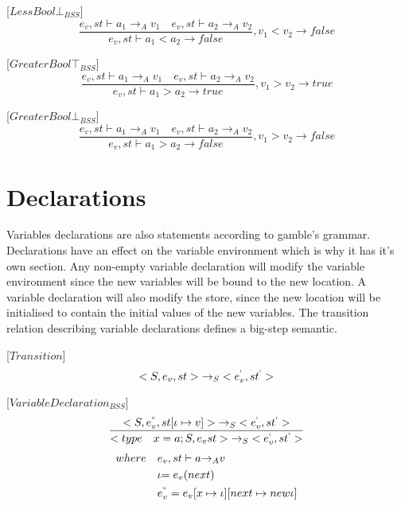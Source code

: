 [${LessBool\bot}_{BSS}$]
\begin{equation}
	\frac { { e }_{ v },st\vdash { a }_{ 1 }{ \rightarrow  }_{ A }{ v }_{ 1 }\quad { e }_{ v },st\vdash { a }_{ 2 }{ \rightarrow  }_{ A }{ v }_{ 2 } }{ { e }_{ v },st\vdash { a }_{ 1 }<{ a }_{ 2 }{ \rightarrow  }false } ,{ v }_{ 1 }<{ v }_{ 2 }\rightarrow false
\end{equation}

[${GreaterBool\top}_{BSS}$]
\begin{equation}
	\frac { { e }_{ v },st\vdash { a }_{ 1 }{ \rightarrow  }_{ A }{ v }_{ 1 }\quad { e }_{ v },st\vdash { a }_{ 2 }{ \rightarrow  }_{ A }{ v }_{ 2 } }{ { e }_{ v },st\vdash { a }_{ 1 }>{ a }_{ 2 }{ \rightarrow  }true } ,{ v }_{ 1 }>{ v }_{ 2 }\rightarrow true
\end{equation}

[${GreaterBool\bot}_{BSS}$]
\begin{equation}
	\frac { { e }_{ v },st\vdash { a }_{ 1 }{ \rightarrow  }_{ A }{ v }_{ 1 }\quad { e }_{ v },st\vdash { a }_{ 2 }{ \rightarrow  }_{ A }{ v }_{ 2 } }{ { e }_{ v },st\vdash { a }_{ 1 }>{ a }_{ 2 }{ \rightarrow  }false } ,{ v }_{ 1 }>{ v }_{ 2 }\rightarrow false
\end{equation}

\section*{Declarations}
Variables declarations are also statements according to \gls{gamble}'s grammar.
Declarations have an effect on the variable environment which is why it has it's own section.
Any non-empty variable declaration will modify the variable environment since the new variables will be bound to the new location.
A variable declaration will also modify the store, since the new location will be initialised to contain the initial values of the new variables.
The transition relation describing variable declarations defines a big-step semantic.

[$Transition$]
\begin{equation}
<{ S },{ e }_{ v },st>{ \rightarrow  }_{ S }<{ e }_{ v }^{ ` },{ st }^{ ` }>
\end{equation}

[${VariableDeclaration}_{BSS}$]
\begin{equation}
	\frac { <S,{ e }_{ v }^{ `` },st[\iota \mapsto v]>{ \rightarrow  }_{ S }<{ e }_{ v }^{ ` },{ st }^{ ` }> }{ <type\quad x=a;S,{ e }_{ v }st>{ \rightarrow  }_{ S }<{ e }_{ v }^{ ` },{ st }^{ ` }> } 
\end{equation}
\begin{align*}
	where\quad &{ e }_{ v },st\vdash a{ \rightarrow  }_{ A }v \\
	&\iota {= e }_{ v }(next) \\
	&{ e }_{ v }^{ `` }={ e }_{ v }[x\mapsto \iota ][next\mapsto new \iota ]
\end{align*}

